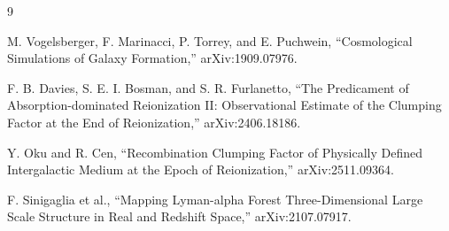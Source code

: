 \documentclass[
    aps,
    prd,
    preprint,
    onecolumn,
    nofootinbib,
    groupedaddress
]{revtex4-2}
\begin{document}
\begin{thebibliography}{9}

M. Vogelsberger, F. Marinacci, P. Torrey, and E. Puchwein,
``Cosmological Simulations of Galaxy Formation,''
arXiv:1909.07976.

F. B. Davies, S. E. I. Bosman, and S. R. Furlanetto,
``The Predicament of Absorption-dominated Reionization II: Observational Estimate of the Clumping Factor at the End of Reionization,''
arXiv:2406.18186.

Y. Oku and R. Cen,
``Recombination Clumping Factor of Physically Defined Intergalactic Medium at the Epoch of Reionization,''
arXiv:2511.09364.

F. Sinigaglia et al.,
``Mapping Lyman-alpha Forest Three-Dimensional Large Scale Structure in Real and Redshift Space,''
arXiv:2107.07917.

\end{thebibliography}
\end{document}
